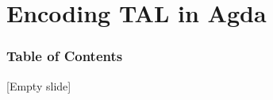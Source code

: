\section{Encoding TAL in Agda}
\begin{frame}
\frametitle{Table of Contents}
\tableofcontents[currentsection]
\end{frame}

\begin{frame}{}{}
  {[Empty slide]}
\end{frame}
